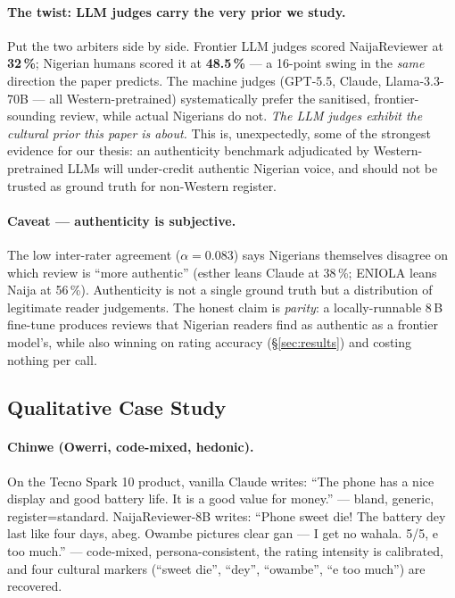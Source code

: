 \documentclass[sigconf,nonacm,balance]{acmart}
\begin{document}
\paragraph{The twist: LLM judges carry the very prior we study.} Put the
two arbiters side by side. Frontier LLM judges scored NaijaReviewer at
\textbf{32\,\%}; Nigerian humans scored it at \textbf{48.5\,\%} --- a
16-point swing in the \emph{same} direction the paper predicts. The
machine judges (GPT-5.5, Claude, Llama-3.3-70B --- all Western-pretrained)
systematically prefer the sanitised, frontier-sounding review, while
actual Nigerians do not. \emph{The LLM judges exhibit the cultural prior
this paper is about.} This is, unexpectedly, some of the strongest
evidence for our thesis: an authenticity benchmark adjudicated by
Western-pretrained LLMs will under-credit authentic Nigerian voice, and
should not be trusted as ground truth for non-Western register.

\paragraph{Caveat --- authenticity is subjective.} The low inter-rater
agreement ($\alpha = 0.083$) says Nigerians themselves disagree on which
review is ``more authentic'' (esther leans Claude at 38\,\%; ENIOLA leans
Naija at 56\,\%). Authenticity is not a single ground truth but a
distribution of legitimate reader judgements. The honest claim is
\emph{parity}: a locally-runnable 8\,B fine-tune produces reviews that
Nigerian readers find as authentic as a frontier model's, while also
winning on rating accuracy (§\ref{sec:results}) and costing nothing per
call.

\subsection{Qualitative Case Study}

\paragraph{Chinwe (Owerri, code-mixed, hedonic).}
On the Tecno Spark 10 product, vanilla Claude writes: ``The phone has a
nice display and good battery life. It is a good value for money.'' ---
bland, generic, register=standard. NaijaReviewer-8B writes: ``Phone
sweet die! The battery dey last like four days, abeg. Owambe pictures
clear gan --- I get no wahala. 5/5, e too much.'' --- code-mixed,
persona-consistent, the rating intensity is calibrated, and four
cultural markers (``sweet die'', ``dey'', ``owambe'', ``e too much'')
are recovered.
\end{document}
